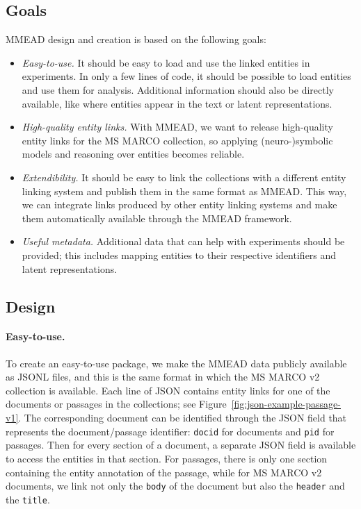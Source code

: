 \subsection{Goals}
MMEAD design and creation is based on the following goals:
\begin{itemize}
	\item \emph{Easy-to-use.} It should be easy to load and use the linked entities in experiments. In only a few lines of code, it should be possible to load entities and use them for analysis. Additional information should also be directly available, like where entities appear in the text or latent representations.
	\item \emph{High-quality entity links.} With MMEAD, we want to release high-quality entity links for the MS MARCO collection, so applying (neuro-)symbolic models and reasoning over entities becomes reliable.  %
	\item \emph{Extendibility.} It should be easy to link the collections with a different entity linking system and publish them in the same format as MMEAD. This way, we can integrate links produced by other entity linking systems and make them automatically available through the MMEAD framework. 
	\item \emph{Useful metadata.} Additional data that can help with experiments should be provided; this includes mapping entities to their respective identifiers and latent representations. 
\end{itemize}

\subsection{Design}
\paragraph{Easy-to-use.} To create an easy-to-use package, we make the MMEAD data publicly available as JSONL files, and this is the same format in which the MS MARCO v2 collection is available. Each line of JSON contains entity links for one of the documents or passages in the collections; see Figure~\ref{fig:json-example-passage-v1}. The corresponding document can be identified through the JSON field that represents the document/passage identifier: \texttt{docid} for documents and \texttt{pid} for passages. Then for every section of a document, a separate JSON field is available to access the entities in that section. For passages, there is only one section containing the entity annotation of the passage, while for MS MARCO v2 documents, we link not only the \texttt{body} of the document but also the \texttt{header} and the \texttt{title}.

